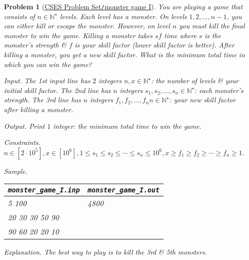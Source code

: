 \documentclass{article}
\newtheorem{problem}{Problem}
\begin{document}
\begin{problem}[\href{https://cses.fi/problemset/task/2084}{CSES Problem Set{\tt/}monster game I}]
    You are playing a game that consists of $n\in\mathbb{N}^\star$ levels. Each level has a monster. On levels $1,2,\ldots,n - 1$, you can either kill or escape the monster. However, on level $n$ you must kill the final monster to win the game. Killing a monster takes $sf$ time where $s$ is the monster's strength \& $f$ is your skill factor (lower skill factor is better). After killing a monster, you get a new skill factor. What is the minimum total time in which you can win the game?
    \item {\sf Input.} The 1st input line has $2$ integers $n,x\in\mathbb{N}^\star$: the number of levels \& your initial skill factor. The 2nd line has $n$ integers $s_1,s_2,\ldots,s_n\in\mathbb{N}^\star$: each monster's strength. The 3rd line has $n$ integers $f_1,f_2,\ldots,f_nn\in\mathbb{N}^\star$: your new skill factor after killing a monster.
    \item {\sf Output.} Print $1$ integer: the minimum total time to win the game.
    \item {\sf Constraints.} $n\in[2\cdot10^5],x\in[10^6],1\le s_1\le s_2\le\cdots\le s_n\le10^6,x\ge f_1\ge f_2\ge\cdots\ge f_n\ge1$.
    \item {\sf Sample.}
    \begin{table}[H]
        \centering
        \begin{tabular}{|l|l|}
            \hline
            \verb|monster_game_I.inp| & \verb|monster_game_I.out| \\
            \hline
            5 100 & 4800 \\
            20 30 30 50 90 & \\
            90 60 20 20 10 & \\
            \hline
        \end{tabular}
    \end{table}
    \item {\sf Explanation.} The best way to play is to kill the 3rd \& 5th monsters.
\end{problem}
\end{document}
